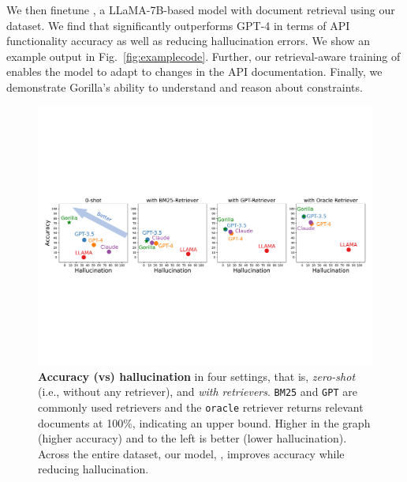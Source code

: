 We then finetune \oursmethod{}, a LLaMA-7B-based model with document retrieval using our dataset. We find that \oursmethod{} significantly outperforms GPT-4 in terms of API functionality accuracy as well as reducing hallucination errors. We show an example output in Fig.~\ref{fig:examplecode}.  Further, our retrieval-aware training of \gorilla{} enables the model to adapt to changes in the API documentation. Finally, we demonstrate Gorilla's ability to understand and reason about constraints.



\begin{figure}[t]
    \includegraphics[width=\linewidth]{figures/average_grid.pdf}
\caption{\footnotesize \textbf{Accuracy (vs) hallucination} in four settings, that is,  \emph{zero-shot} (i.e., without any retriever), and \emph{with retrievers}. \texttt{BM25} and \texttt{GPT} are commonly used retrievers and the \texttt{oracle} retriever returns relevant documents at 100\%, indicating an upper bound. Higher in the graph (higher accuracy) and to the left is better (lower hallucination). Across the entire dataset, our model, \oursmethod{}, improves accuracy while reducing hallucination.}
\label{fig:acc-hallu}
\end{figure}


